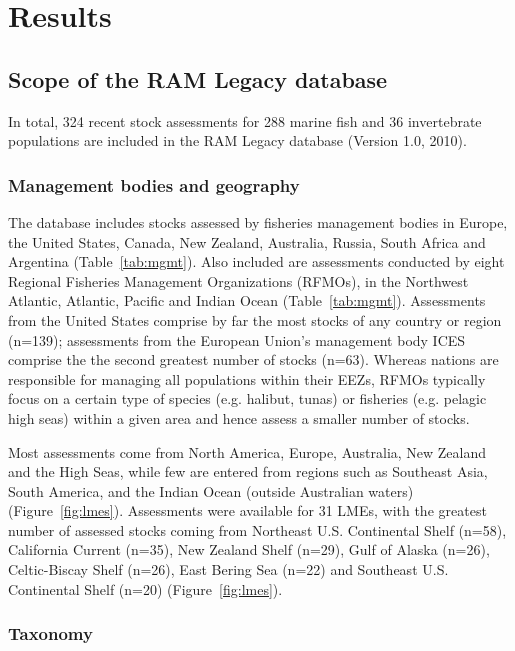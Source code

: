 \newpage
\section*{Results}
\subsection*{Scope of the RAM Legacy database}
In total, 324 recent stock assessments for
288 marine fish and 36
invertebrate populations are included in the RAM Legacy database
(Version 1.0, 2010).

\subsubsection*{Management bodies and geography}
The database includes stocks assessed by fisheries management bodies
in Europe, the United States, Canada, New Zealand, Australia, Russia,
South Africa and Argentina (Table~\ref{tab:mgmt}). Also included are assessments
conducted by eight Regional Fisheries Management Organizations
(RFMOs), in the Northwest Atlantic, Atlantic, Pacific and Indian Ocean
(Table~\ref{tab:mgmt}). Assessments from the United States comprise by far the most
stocks of any country or region (n=139);
assessments from the European Union's management body ICES comprise
the the second greatest number of stocks (n=63).
Whereas nations are responsible for managing all populations within
their EEZs, RFMOs typically focus on a certain type of species (e.g.
halibut, tunas) or fisheries (e.g. pelagic high seas) within a given
area and hence assess a smaller number of stocks.

Most assessments come from North America, Europe, Australia, New
Zealand and the High Seas, while few are entered from regions such as
Southeast Asia, South America, and the Indian Ocean (outside
Australian waters) (Figure~\ref{fig:lmes}). Assessments were available for 31 LMEs, with the greatest number of
assessed stocks coming from Northeast U.S. Continental Shelf (n=58),
California Current (n=35), New Zealand Shelf (n=29),
Gulf of Alaska (n=26), Celtic-Biscay Shelf (n=26), East Bering Sea (n=22)
and Southeast U.S. Continental Shelf (n=20) (Figure~\ref{fig:lmes}).


\subsubsection*{Taxonomy}

